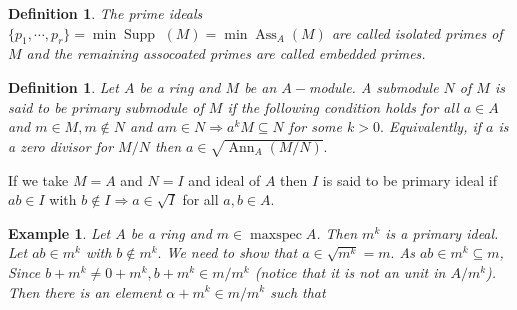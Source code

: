 \documentclass[11pt]{amsart}
\newtheorem{defn}[theorem]{Definition}
\newtheorem{eg}[theorem]{Example}
\DeclareMathOperator{\ann}{\text{Ann}}
\DeclareMathOperator{\ass}{\text{Ass}}
\DeclareMathOperator{\supp}{\text{Supp~}}
\DeclareMathOperator{\mspec}{\text{maxspec}}
\begin{document}
\begin{defn}

The prime ideals $\{p_1,\cdots,p_r\}=\min\supp(M)=\min \ass_A(M)$ are called isolated primes of $M$ and the remaining assocoated primes are called embedded primes.

\end{defn}

\begin{defn}

Let $A$ be a ring and $M$ be an $A-$module. A submodule $N$ of $M$ is said to be primary submodule of $M$ if the following condition holds for all $a\in A$ and $m\in M,m\notin N$ and $am\in N \Rightarrow a^kM\subseteq N$ for some $k>0.$ Equivalently, if $a$ is a zero divisor for $M/N$ then $a\in \sqrt{\ann_A(M/N)}.$

\end{defn}

If we take $M=A$ and $N=I$ and ideal of $A$ then $I$ is said to be primary ideal if $ab\in I$ with $b\notin I \Rightarrow a\in \sqrt{I}$ for all $a,b\in A.$

\begin{eg}

Let $A$ be a ring and $m\in\mspec A$. Then $m^k$ is a primary ideal. Let $ab\in m^k$ with $b\notin m^k.$ We need to show that $a\in \sqrt{m^k}=m.$ As $ab\in m^k\subseteq m$,  Since $b+m^k\neq 0+m^k,b+m^k\in m/m^k$ (notice that it is not an unit in $A/m^k$). Then there is an element $\alpha+m^k\in m/m^k$ such that 

\end{eg}
\end{document}
